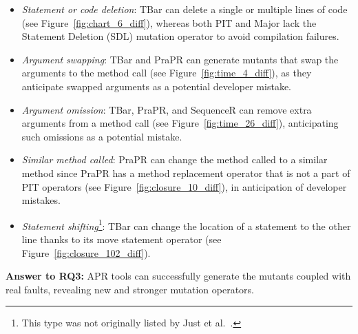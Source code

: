 \documentclass[conference]{IEEEtran}
\begin{document}
\begin{itemize}
\item \textit{Statement or code deletion}: TBar can delete a single or multiple 
lines of code (see Figure~\ref{fig:chart_6_diff}), whereas both PIT and Major 
lack the Statement Deletion (SDL) mutation operator to avoid compilation 
failures. 

\item \textit{Argument swapping}: TBar and PraPR can generate mutants that swap 
the arguments to the method call (see Figure~\ref{fig:time_4_diff}), as they 
anticipate swapped arguments as a potential developer mistake. 

\item \textit{Argument omission}: TBar, PraPR, and SequenceR can remove
extra arguments from a method call (see Figure~\ref{fig:time_26_diff}), anticipating such omissions as a potential mistake. 
    
\item \textit{Similar method called}: PraPR can change the method called to 
a similar method since PraPR has a method replacement operator that is 
not a part of PIT operators (see Figure~\ref{fig:closure_10_diff}), in anticipation of developer mistakes.
    
\item \textit{Statement shifting}\footnote{This type was not originally
listed by Just et al.~\cite{just2014mutants}.}: TBar can change the location
of a statement to the other line thanks to its move statement operator (see
Figure~\ref{fig:closure_102_diff}).
\end{itemize}
 

 




\begin{tcolorbox}[boxrule=0pt,frame hidden,sharp corners,enhanced,borderline north={1pt}{0pt}{black},borderline south={1pt}{0pt}{black},boxsep=2pt,left=2pt,right=2pt,top=2.5pt,bottom=2pt]
\textbf{Answer to RQ3:} APR tools can successfully generate the mutants coupled 
with real faults, revealing new and stronger mutation operators.
\end{tcolorbox}
\end{document}
